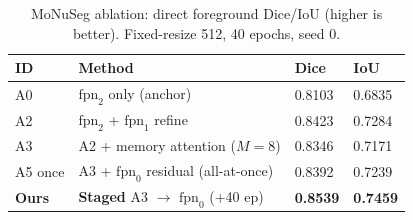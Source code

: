 \begin{table}[htbp]
  \centering
  \small
  \begin{tabular}{llll}
  \toprule
  \textbf{ID} & \textbf{Method} & \textbf{Dice} & \textbf{IoU} \\
  \midrule
  A0 & $\text{fpn}_2$ only (anchor) & 0.8103 & 0.6835 \\
  A2 & $\text{fpn}_2$ + $\text{fpn}_1$ refine & 0.8423 & 0.7284 \\
  A3 & A2 + memory attention ($M{=}8$) & 0.8346 & 0.7171 \\
  A5 once & A3 + $\text{fpn}_0$ residual (all-at-once) & 0.8392 & 0.7239 \\
  \textbf{Ours} & \textbf{Staged} A3 $\to$ $\text{fpn}_0$ (+40 ep) & \textbf{0.8539} & \textbf{0.7459} \\
  \bottomrule
  \end{tabular}
  \caption{MoNuSeg ablation: direct foreground Dice/IoU (higher is better). Fixed-resize 512, 40 epochs, seed 0.}
  \label{tab:main_ablation}
\end{table}
